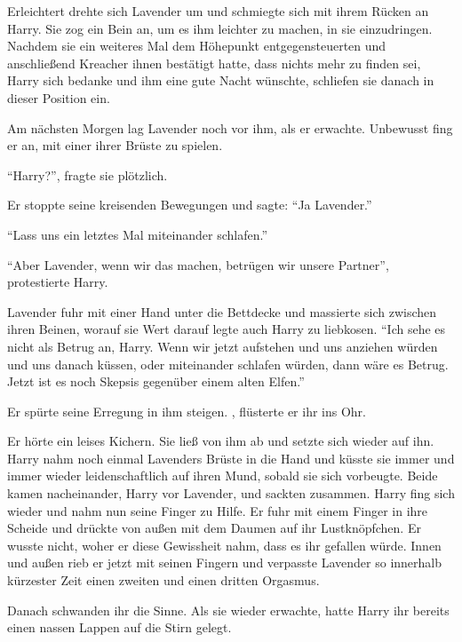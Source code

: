 \begin{abAchtzehn}
Erleichtert drehte sich Lavender um und schmiegte sich mit ihrem Rücken an Harry. Sie zog ein Bein an, um es ihm leichter zu machen, in sie einzudringen. Nachdem sie ein weiteres Mal dem Höhepunkt entgegensteuerten und anschließend Kreacher ihnen bestätigt hatte, dass nichts mehr zu finden sei, Harry sich bedanke und ihm eine gute Nacht wünschte, schliefen sie danach in dieser Position ein.

Am nächsten Morgen lag Lavender noch vor ihm, als er erwachte. Unbewusst fing er an, mit einer ihrer Brüste zu spielen.

\enquote{Harry?}, fragte sie plötzlich.

Er stoppte seine kreisenden Bewegungen und sagte: \enquote{Ja Lavender.}

\enquote{Lass uns ein letztes Mal miteinander schlafen.}

\enquote{Aber Lavender, wenn wir das machen, betrügen wir unsere Partner}, protestierte Harry.

Lavender fuhr mit einer Hand unter die Bettdecke und massierte sich zwischen ihren Beinen, worauf sie Wert darauf legte auch Harry zu liebkosen. \enquote{Ich sehe es nicht als Betrug an, Harry. Wenn wir jetzt aufstehen und uns anziehen würden und uns danach küssen, oder miteinander schlafen würden, dann wäre es Betrug. Jetzt ist es noch Skepsis gegenüber einem alten Elfen.}

Er spürte seine Erregung in ihm steigen. , flüsterte er ihr ins Ohr. 

Er hörte ein leises Kichern. Sie ließ von ihm ab und setzte sich wieder auf ihn. Harry nahm noch einmal Lavenders Brüste in die Hand und küsste sie immer und immer wieder leidenschaftlich auf ihren Mund, sobald sie sich vorbeugte. Beide kamen nacheinander, Harry vor Lavender, und sackten zusammen. Harry fing sich wieder und nahm nun seine Finger zu Hilfe. Er fuhr mit einem Finger in ihre Scheide und drückte von außen mit dem Daumen auf ihr Lustknöpfchen. Er wusste nicht, woher er diese Gewissheit nahm, dass es ihr gefallen würde. Innen und außen rieb er jetzt mit seinen Fingern und verpasste Lavender so innerhalb kürzester Zeit einen zweiten und einen dritten Orgasmus. 
\end{abAchtzehn}

\begin{safedivide}
\fskdivider
\end{safedivide}

Danach schwanden ihr die Sinne. Als sie wieder erwachte, hatte Harry ihr bereits einen nassen Lappen auf die Stirn gelegt.

